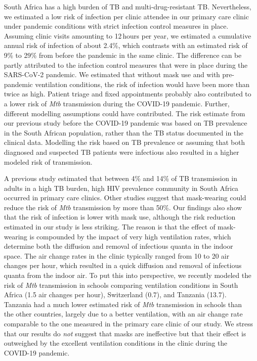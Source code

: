 \documentclass[fleqn,11pt]{wlscirep}
\begin{document}
South Africa has a high burden of TB and multi-drug-resistant TB\cite{WHO2023TBReport}. Nevertheless, we estimated a low risk of infection per clinic attendee in our primary care clinic under pandemic conditions with strict infection control measures in place. Assuming clinic visits amounting to 12\,hours per year, we estimated a cumulative annual risk of infection of about 2.4\%, which contrasts with an estimated risk of 9\% to 29\% from before the pandemic in the same clinic\cite{Zurcher2022JID}. The difference can be partly attributed to the infection control measures that were in place during the SARS-CoV-2 pandemic. We estimated that without mask use and with pre-pandemic ventilation conditions, the risk of infection would have been more than twice as high. Patient triage and fixed appointments probably also contributed to a lower risk of \emph{Mtb} transmission during the COVID-19 pandemic. Further, different modelling assumptions could have contributed. The risk estimate from our previous study before the COVID-19 pandemic\cite{Zurcher2022JID} was based on TB prevalence in the South African population, rather than the TB status documented in the clinical data. Modelling the risk based on TB prevalence or assuming that both diagnosed and suspected TB patients were infectious also resulted in a higher modeled risk of transmission. 

A previous study estimated that between 4\% and 14\% of TB transmission in adults in a high TB burden, high HIV prevalence community in South Africa occurred in primary care clinics\cite{McCreesh2022BMJGlobalHealth}. Other studies suggest that mask-wearing could reduce the risk of \emph{Mtb} transmission by more than 50\%\cite{Dharmadhikari2012AJRCCM,McCreesh2021BMJGlobalHealth}. Our findings also show that the risk of infection is lower with mask use, although the risk reduction estimated in our study is less striking. The reason is that the effect of mask-wearing is compounded by the impact of very high ventilation rates, which determine both the diffusion and removal of infectious quanta in the indoor space. The air change rates in the clinic typically ranged from 10 to 20 air changes per hour, which resulted in a quick diffusion and removal of infectious quanta from the indoor air. To put this into perspective, we recently modeled the risk of \emph{Mtb} transmission in schools comparing ventilation conditions in South Africa (1.5 air changes per hour), Switzerland (0.7), and Tanzania (13.7)\cite{Banholzer2024PGPH}. Tanzania had a much lower estimated risk of \emph{Mtb} transmission in schools than the other countries, largely due to a better ventilation, with an air change rate comparable to the one measured in the primary care clinic of our study. We stress that our results do \emph{not} suggest that masks are ineffective but that their effect is outweighed by the excellent ventilation conditions in the clinic during the COVID-19 pandemic.
\end{document}
